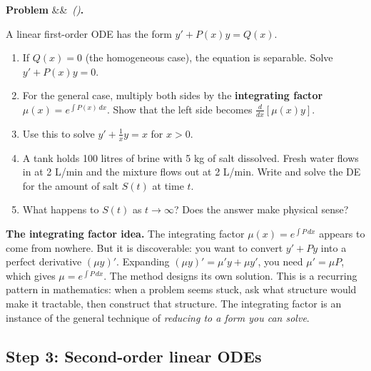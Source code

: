 \documentclass[12pt, a4paper]{article}
\newcounter{problem}
\newenvironment{problem}[1][]{%
  \refstepcounter{problem}%
  \par\vspace{6pt}%
  \noindent\textbf{\color{MidBlue}Problem \theproblem}%
  \ifx&#1&\else\ \textit{(#1)}\fi\textbf{.}\enskip
}{\par\vspace{4pt}}
\begin{document}
\begin{problem}
\label{prob:linear_first}
A linear first-order ODE has the form $y' + P(x)y = Q(x)$.
\begin{enumerate}[label=(\alph*), topsep=2pt]
  \item If $Q(x) = 0$ (the homogeneous case), the equation is separable. Solve $y' + P(x)y = 0$.
  \item For the general case, multiply both sides by the \textbf{integrating factor} $\mu(x) = e^{\int P(x)\,dx}$. Show that the left side becomes $\frac{d}{dx}[\mu(x) y]$.
  \item Use this to solve $y' + \frac{1}{x}y = x$ for $x > 0$.
  \item A tank holds 100 litres of brine with 5 kg of salt dissolved. Fresh water flows in at 2 L/min and the mixture flows out at 2 L/min. Write and solve the DE for the amount of salt $S(t)$ at time $t$.
  \item What happens to $S(t)$ as $t \to \infty$? Does the answer make physical sense?
\end{enumerate}
\end{problem}

\begin{thought}
\textbf{The integrating factor idea.}
The integrating factor $\mu(x) = e^{\int P\,dx}$ appears to come from nowhere. But it is discoverable: you want to convert $y' + Py$ into a perfect derivative $(\mu y)'$. Expanding $(\mu y)' = \mu' y + \mu y'$, you need $\mu' = \mu P$, which gives $\mu = e^{\int P\,dx}$. The method designs its own solution. This is a recurring pattern in mathematics: when a problem seems stuck, ask what structure would make it tractable, then construct that structure. The integrating factor is an instance of the general technique of \emph{reducing to a form you can solve}.
\end{thought}

\subsection{Step 3: Second-order linear ODEs}
\end{document}
